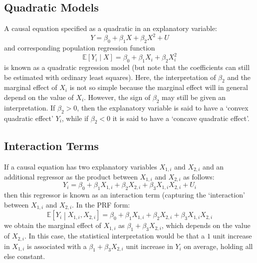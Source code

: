 \documentclass[11pt]{report} %
\begin{document}
\subsection{Quadratic Models}

A causal equation specified as a quadratic in an explanatory variable:
\begin{equation}
Y = \beta_{0} + \beta_{1}X + \beta_{2}X^{2} + U
\end{equation}
and corresponding population regression function
\begin{equation}
\mathbb{E}\left[Y_{i}\middle|X\right] =  \beta_{0} + \beta_{1}X_{i} + \beta_{2}X_{i}^{2}
\end{equation}
is known as a quadratic regression model (but note that the coefficients can still be estimated with ordinary least squares). Here, the interpretation of $\beta_{2}$ and the marginal effect of $X_{i}$ is not so simple because the marginal effect will in general depend on the value of $X_{i}$. However, the sign of $\beta_{2}$ may still be given an interpretation. If $\beta_{2} > 0$, then the explanatory variable is said to have a `convex quadratic effect' $Y_{i}$, while if $\beta_{2} < 0$ it is said to have a `concave quadratic effect'.

\subsection{Interaction Terms \cite{Stock2015}}

If a causal equation has two explanatory variables $X_{1, i}$ and $X_{2, i}$ and an additional regressor as the product between $X_{1, i}$ and $X_{2, i}$ as follows:
\begin{equation}
Y_{i} = \beta_{0} + \beta_{1}X_{1, i} + \beta_{2}X_{2, i} + \beta_{3}X_{1, i}X_{2, i} + U_{i}
\end{equation}
then this regressor is known as an interaction term (capturing the `interaction' between $X_{1, i}$ and $X_{2, i}$. In the PRF form:
\begin{equation}
\mathbb{E}\left[Y_{i}\middle|X_{1, i}, X_{2, i}\right] = \beta_{0} + \beta_{1}X_{1, i} + \beta_{2}X_{2, i} + \beta_{3}X_{1, i}X_{2, i}
\end{equation}
we obtain the marginal effect of $X_{1, i}$ as $\beta_{1} + \beta_{3}X_{2, i}$, which depends on the value of $X_{2, i}$. In this case, the statistical interpretation would be that a $1$ unit increase in $X_{1, i}$ is associated with a $\beta_{1} + \beta_{3}X_{2, i}$ unit increase in $Y_{i}$ on average, holding all else constant.
\end{document}
